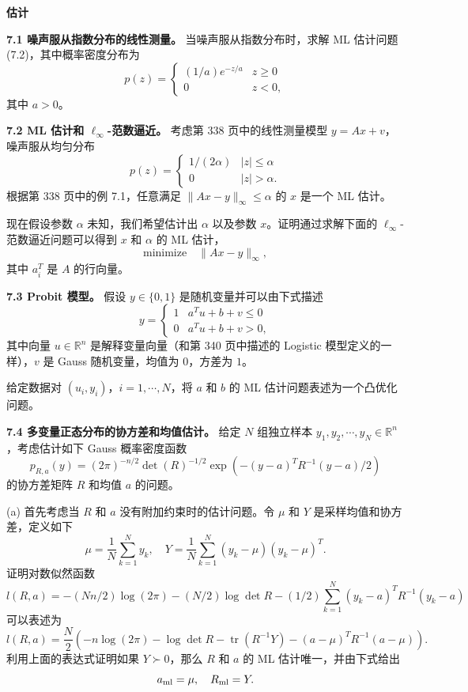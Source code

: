 \documentclass[UTF8,12pt,a4paper,fontset=fandol]{ctexart}
\begin{document}
\noindent\textbf{估计}

\noindent\textbf{7.1 噪声服从指数分布的线性测量。}\quad
当噪声服从指数分布时，求解 ML 估计问题 (7.2)，其中概率密度分布为
\[
p(z)=
\begin{cases}
(1/a)e^{-z/a} & z\geq 0\\
0 & z<0,
\end{cases}
\]
其中 $a>0$。

\noindent\textbf{7.2 ML 估计和 $\ell_\infty$-范数逼近。}\quad
考虑第 338 页中的线性测量模型 $y=Ax+v$，噪声服从均匀分布
\[
p(z)=
\begin{cases}
1/(2\alpha) & |z|\leq \alpha\\
0 & |z|>\alpha.
\end{cases}
\]
根据第 338 页中的例 7.1，任意满足 $\|Ax-y\|_\infty\leq \alpha$ 的 $x$ 是一个 ML 估计。

现在假设参数 $\alpha$ 未知，我们希望估计出 $\alpha$ 以及参数 $x$。证明通过求解下面的 $\ell_\infty$-范数逼近问题可以得到 $x$ 和 $\alpha$ 的 ML 估计，
\[
\text{minimize}\quad \|Ax-y\|_\infty,
\]
其中 $a_i^T$ 是 $A$ 的行向量。

\noindent\textbf{7.3 Probit 模型。}\quad
假设 $y\in\{0,1\}$ 是随机变量并可以由下式描述
\[
y=
\begin{cases}
1 & a^Tu+b+v\leq 0\\
0 & a^Tu+b+v>0,
\end{cases}
\]
其中向量 $u\in\mathbb{R}^n$ 是解释变量向量（和第 340 页中描述的 Logistic 模型定义的一样），$v$ 是 Gauss 随机变量，均值为 $0$，方差为 $1$。

给定数据对 $(u_i,y_i)$，$i=1,\cdots,N$，将 $a$ 和 $b$ 的 ML 估计问题表述为一个凸优化问题。

\noindent\textbf{7.4 多变量正态分布的协方差和均值估计。}\quad
给定 $N$ 组独立样本 $y_1,y_2,\cdots,y_N\in\mathbb{R}^n$，考虑估计如下 Gauss 概率密度函数
\[
p_{R,a}(y)=(2\pi)^{-n/2}\det(R)^{-1/2}\exp\left(-(y-a)^TR^{-1}(y-a)/2\right)
\]
的协方差矩阵 $R$ 和均值 $a$ 的问题。

(a) 首先考虑当 $R$ 和 $a$ 没有附加约束时的估计问题。令 $\mu$ 和 $Y$ 是采样均值和协方差，定义如下
\[
\mu=\frac{1}{N}\sum_{k=1}^N y_k,\quad
Y=\frac{1}{N}\sum_{k=1}^N(y_k-\mu)(y_k-\mu)^T.
\]
证明对数似然函数
\[
l(R,a)=-(Nn/2)\log(2\pi)-(N/2)\log\det R-(1/2)\sum_{k=1}^N(y_k-a)^TR^{-1}(y_k-a)
\]
可以表述为
\[
l(R,a)=\frac{N}{2}\left(-n\log(2\pi)-\log\det R-\operatorname{tr}(R^{-1}Y)-(a-\mu)^TR^{-1}(a-\mu)\right).
\]
利用上面的表达式证明如果 $Y\succ 0$，那么 $R$ 和 $a$ 的 ML 估计唯一，并由下式给出
\[
a_{\rm ml}=\mu,\quad R_{\rm ml}=Y.
\]
\end{document}
